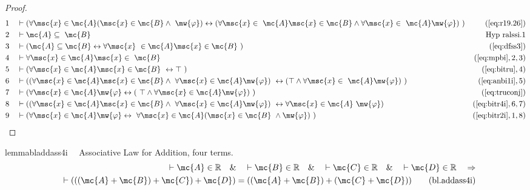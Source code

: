 \begin{proof}
\begin{align}
  1 &&  & \vdash ( \forall \msc{x} \in \mc{A} ( \msc{x} \in \mc{B} \wedge
     ~\mw{\varphi} ) \leftrightarrow ( \forall \msc{x} \in
     ~\mc{A} \msc{x} \in \mc{B} \wedge \forall \msc{x} \in
     ~\mc{A} \mw{\varphi} )
     ~)&(\mbox{\ref{eq:r19.26}})\notag
  \\ 2 &&  & \vdash \mc{A} \subseteq
     ~\mc{B}&\text{Hyp~ralssi.1}\notag%
  \\ 3 &&  & \vdash ( \mc{A} \subseteq \mc{B} \leftrightarrow \forall \msc{x}
     ~\in \mc{A} \msc{x} \in \mc{B}
     ~)&(\mbox{\ref{eq:dfss3}})\notag
  \\ 4 &&  & \vdash \forall \msc{x} \in \mc{A} \msc{x} \in
     ~\mc{B}&(\mbox{\ref{eq:mpbi}},2,3)\notag
  \\ 5 &&  & \vdash ( \forall \msc{x} \in \mc{A} \msc{x} \in \mc{B}
     ~\leftrightarrow \top
     ~)&(\mbox{\ref{eq:bitru}},4)\notag
  \\ 6 &&  & \vdash ( ( \forall \msc{x} \in \mc{A} \msc{x} \in \mc{B} \wedge
     ~\forall \msc{x} \in \mc{A} \mw{\varphi} )
     ~\leftrightarrow ( \top \wedge \forall \msc{x} \in
     ~\mc{A} \mw{\varphi} )
     ~)&(\mbox{\ref{eq:anbi1i}},5)\notag
  \\ 7 &&  & \vdash ( \forall \msc{x} \in \mc{A} \mw{\varphi} \leftrightarrow (
     ~\top \wedge \forall \msc{x} \in \mc{A} \mw{\varphi} )
     ~)&(\mbox{\ref{eq:truconj}})\notag
  \\ 8 &&  & \vdash ( ( \forall \msc{x} \in \mc{A} \msc{x} \in \mc{B} \wedge
     ~\forall \msc{x} \in \mc{A} \mw{\varphi} )
     ~\leftrightarrow \forall \msc{x} \in \mc{A}
     ~\mw{\varphi} )&(\mbox{\ref{eq:bitr4i}},6,7)\notag
  \\ 9 &&  & \vdash ( \forall \msc{x} \in \mc{A} \mw{\varphi} \leftrightarrow
     ~\forall \msc{x} \in \mc{A} ( \msc{x} \in \mc{B}
     ~\wedge \mw{\varphi} )
     ~)&(\mbox{\ref{eq:bitr2i}},1,8)\notag
\end{align}
\end{proof}

\begin{restatable}{lemma}{bladdass4i}~~ Associative Law for Addition, four
terms.
\begin{align}
\vdash \mc{A} \in \mathbb{R}\quad\&\quad \vdash \mc{B} \in
    \mathbb{R}\quad\&\quad \vdash \mc{C} \in \mathbb{R}\quad\&\quad \vdash
    \mc{D} \in \mathbb{R}\quad\Rightarrow \notag \\ 
	\quad \vdash ( ( ( \mc{A} + \mc{B} ) +
    \mc{C} ) + \mc{D} ) = ( ( \mc{A} + \mc{B} ) + ( \mc{C} + \mc{D} )
    )\label{eq:bl.addass4i}\tag{bl.addass4i}
\end{align}
\end{restatable}

